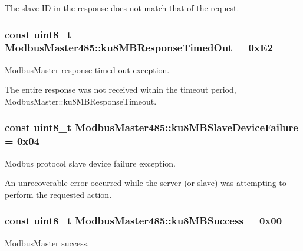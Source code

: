 The slave ID in the response does not match that of the request. 
\subsubsection[{\texorpdfstring{ku8\+M\+B\+Response\+Timed\+Out}{ku8MBResponseTimedOut}}]{\setlength{\rightskip}{0pt plus 5cm}const uint8\+\_\+t Modbus\+Master485\+::ku8\+M\+B\+Response\+Timed\+Out = 0x\+E2\hspace{0.3cm}{\ttfamily [static]}}\hypertarget{class_modbus_master485_a16a3978380bf0be30685dc082452a13f}{}\label{class_modbus_master485_a16a3978380bf0be30685dc082452a13f}
Modbus\+Master response timed out exception.

The entire response was not received within the timeout period, Modbus\+Master\+::ku8\+M\+B\+Response\+Timeout. 
\subsubsection[{\texorpdfstring{ku8\+M\+B\+Slave\+Device\+Failure}{ku8MBSlaveDeviceFailure}}]{\setlength{\rightskip}{0pt plus 5cm}const uint8\+\_\+t Modbus\+Master485\+::ku8\+M\+B\+Slave\+Device\+Failure = 0x04\hspace{0.3cm}{\ttfamily [static]}}\hypertarget{class_modbus_master485_aca7c2882e4cfd65b9eac00ba1f5d1f23}{}\label{class_modbus_master485_aca7c2882e4cfd65b9eac00ba1f5d1f23}
Modbus protocol slave device failure exception.

An unrecoverable error occurred while the server (or slave) was attempting to perform the requested action. 
\subsubsection[{\texorpdfstring{ku8\+M\+B\+Success}{ku8MBSuccess}}]{\setlength{\rightskip}{0pt plus 5cm}const uint8\+\_\+t Modbus\+Master485\+::ku8\+M\+B\+Success = 0x00\hspace{0.3cm}{\ttfamily [static]}}\hypertarget{class_modbus_master485_a4cf669f82295bd503124df2420d6269a}{}\label{class_modbus_master485_a4cf669f82295bd503124df2420d6269a}
Modbus\+Master success.

